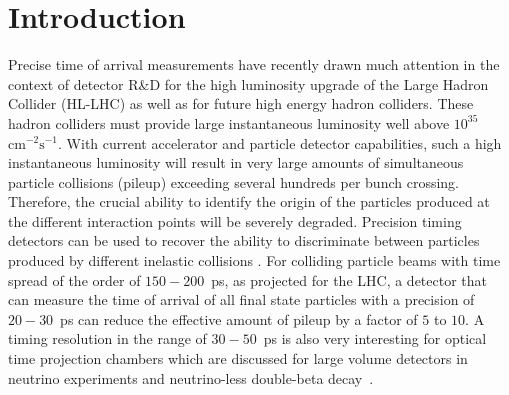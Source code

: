 \section{Introduction}
\label{sec:introduction}


Precise time of arrival measurements have recently drawn much attention in the
context of detector R\&D for the high luminosity upgrade of the Large Hadron
Collider (HL-LHC) as well as for future high energy hadron colliders. These
hadron colliders must provide large instantaneous luminosity well above
$10^{35}$~$\mathrm{cm}^{-2}\mathrm{s}^{-1}$. With current accelerator and
particle detector capabilities, such a high instantaneous luminosity will result
in very large amounts of simultaneous particle collisions (pileup) exceeding
several hundreds per bunch crossing. Therefore, the crucial ability to identify
the origin of the particles produced at the different interaction points will be
severely degraded. Precision timing detectors can be used to recover the ability
to discriminate between particles produced by different inelastic collisions
\cite{adielba}. For colliding particle beams with time spread of the order of
$150-200$~ps, as projected for the LHC, a detector that can measure the time of
arrival of all final state particles with a precision of $20-30$~ps can reduce
the effective amount of pileup by a factor of $5$ to $10$. A timing
resolution in the range of $30-50$~ps is also very interesting for
optical time projection chambers which are discussed for large volume detectors
in neutrino experiments and neutrino-less double-beta
decay~\cite{Aberle:2013jba, otpc}. 

